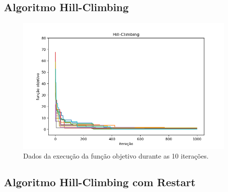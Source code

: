 \subsection{Algoritmo Hill-Climbing}

\begin{figure}[H]
\centering
\includegraphics[width=110mm]{imagens/otima/problema-2-hill-climbing-funcao-objetivo-best.png}
\caption{Dados da execução da função objetivo durante as 10 iterações.
\label{fig:problema-2-hill-climbing-funcao-objetivo}}
\end{figure}

\subsection{Algoritmo Hill-Climbing com Restart}

